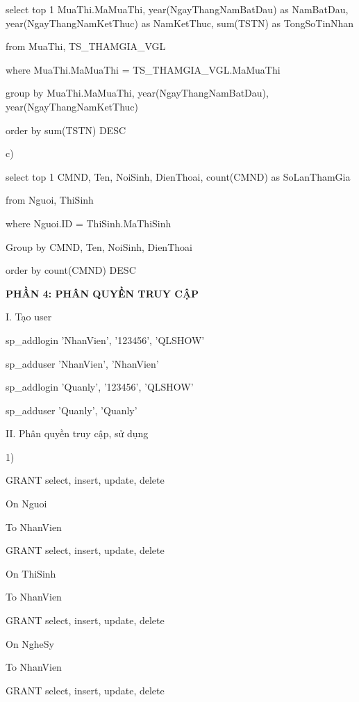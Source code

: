 \documentclass{report}
\begin{document}
\setlength{\parindent}{0.5cm}
select top 1 MuaThi.MaMuaThi, year(NgayThangNamBatDau) as NamBatDau, year(NgayThangNamKetThuc) as NamKetThuc, sum(TSTN) as TongSoTinNhan

from MuaThi, TS\_THAMGIA\_VGL

where MuaThi.MaMuaThi = TS\_THAMGIA\_VGL.MaMuaThi

group by MuaThi.MaMuaThi, year(NgayThangNamBatDau),\\year(NgayThangNamKetThuc)

order by sum(TSTN) DESC

\setlength{\parindent}{0cm}
\bigskip
c)

\setlength{\parindent}{0.5cm}
select top 1 CMND, Ten, NoiSinh, DienThoai, count(CMND) as SoLanThamGia

from Nguoi, ThiSinh

where Nguoi.ID = ThiSinh.MaThiSinh

Group by CMND, Ten, NoiSinh, DienThoai

order by count(CMND) DESC

\newpage
\changefontsizes{16pt}
\centerline{\textbf{PHẦN 4: PHÂN QUYỀN TRUY CẬP }}

\bigskip
\changefontsizes{13pt}
\setlength{\parindent}{0cm}
I. Tạo user 

\setlength{\parindent}{2cm}
sp\_addlogin 'NhanVien', '123456', 'QLSHOW'

sp\_adduser 'NhanVien', 'NhanVien'


sp\_addlogin 'Quanly', '123456', 'QLSHOW'

sp\_adduser 'Quanly', 'Quanly'

\bigskip
\changefontsizes{13pt}
\setlength{\parindent}{0cm}
II.  Phân quyền truy cập, sử dụng 

1)

\setlength{\parindent}{0.5cm}
GRANT select, insert, update, delete

On Nguoi

To NhanVien

\bigskip

GRANT select, insert, update, delete

On ThiSinh

To NhanVien

\bigskip

GRANT select, insert, update, delete

On NgheSy

To NhanVien

\bigskip

GRANT select, insert, update, delete
\end{document}

